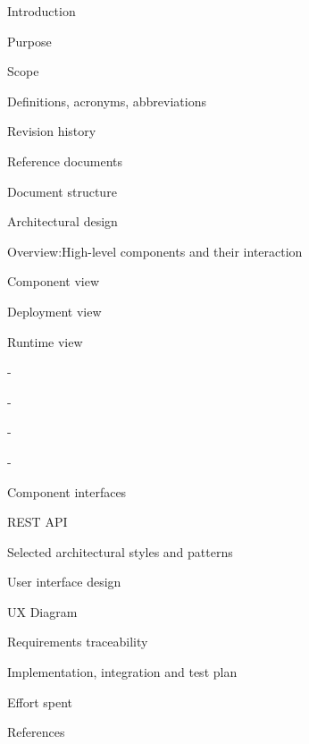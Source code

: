 \documentclass{article}
\begin{document}
	\begin{legal}
 	\item Introduction
  		\begin{legal}
    		\item Purpose
		\item Scope
		\item Definitions, acronyms, abbreviations
		\item Revision history
		\item Reference documents
		\item Document structure	
  		\end{legal}
	\item Architectural design
  		\begin{legal}
    		\item Overview:High-level components and their interaction
		\item Component view
		\item Deployment view
		\item Runtime view
			\begin{legal}
			\item -
			\item -
			\item -
			\item -
	  		\end{legal}
		\item Component interfaces
			\begin{legal}
			\item REST API
	  		\end{legal}
		\item Selected architectural styles and patterns
  		\end{legal}
	\item User interface design
  		\begin{legal}
    		\item UX Diagram
  		\end{legal}
	\item Requirements traceability
	\item Implementation, integration and test plan
  	\item Effort spent
	\item References
	\end{legal}
	
	\newpage
	
	
	
\end{document}

